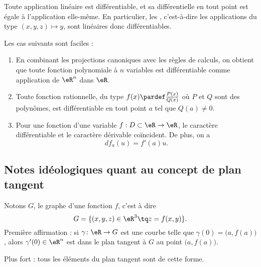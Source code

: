 Toute application linéaire est différentiable, et sa différentielle en
tout point est égale à l'application elle-même. En particulier, les
, c'est-à-dire les applications du type
$(x,y,z) \mapsto y$, sont linéaires donc différentiables.

\begin{example}
Les cas suivants sont faciles :
  \begin{enumerate}
  \item En combinant les projections canoniques avec les règles de
    calculs, on obtient que toute fonction polynomiale à $n$ variables
    est différentiable comme application de $\eR^n$ dans $\eR$.

  \item Toute fonction rationnelle, du type $f(x) \pardef
    \frac{P(x)}{Q(x)}$ où $P$ et $Q$ sont des polynômes, est
    différentiable en tout point $a$ tel que $Q(a) \neq 0$.

  \item Pour une fonction d'une variable $f : D \subset \eR \to
    \eR$, le caractère différentiable et le caractère dérivable
    coïncident. De plus, on a
    \begin{equation*}
      d f_a(u) = f'(a) u.
    \end{equation*}
  \end{enumerate}
\end{example}

                    \subsection{Notes idéologiques quant au concept de plan tangent}
\label{ssecConceptPlanTag}

Notons $G$, le graphe d'une fonction $f$, c'est à dire
\begin{equation}
    G=\{ (x,y,z)\in\eR^3\tq z=f(x,y) \}.
\end{equation}
Première affirmation : si $\gamma\colon \eR\to G$ est une courbe telle que $\gamma(0)=\big( a,f(a) \big)$, alors $\gamma'(0)\in\eR^n$ est dans le plan tangent à $G$ au point $\big( a,f(a) \big)$.

Plus fort : tous les éléments du plan tangent sont de cette forme.

